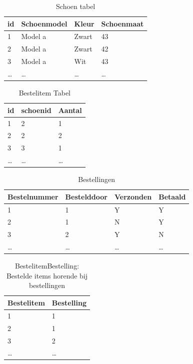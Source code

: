 \documentclass[11pt]{article}
\begin{document}
\begin{table}[hp]
  \centering
  \begin{tabular}{l|l|l|l}
    \textbf{id} & \textbf{Schoenmodel} & \textbf{Kleur} & \textbf{Schoenmaat} \\
    \hline
    1 & Model a              & Zwart          & 43 \\
    2 & Model a              & Zwart          & 42 \\
    3 & Model a              & Wit            & 43 \\
    \ldots & \ldots          & \ldots         & \ldots \\
  \end{tabular}
  \caption{Schoen tabel}
  \label{tab:schoen}
\end{table}

\begin{table}[hp]
  \centering
  \begin{tabular}{l|l|l}
    \textbf{id} & \textbf{schoenid} & \textbf{Aantal} \\\hline
    1           & 2                 & 1               \\
    2           & 2                 & 2               \\
    3           & 3                 & 1               \\
    \ldots      & \ldots            & \ldots          \\
  \end{tabular}
  \caption{Bestelitem Tabel}
  \label{tab:bestelitem}
\end{table}

\begin{table}[hp]
  \centering
  \begin{tabular}{l|l|l|l}
    \textbf{Bestelnummer} & \textbf{Bestelddoor} & \textbf{Verzonden} 
    & \textbf{Betaald} \\
    \hline
    1 & 1                &  Y & Y \\
    2 & 1                &  N & Y \\
    3 & 2                & Y  & N \\
    \ldots & \ldots & \ldots & \ldots \\
  \end{tabular}
  \caption{Bestellingen}
  \label{tab:bestellingen}
\end{table}

\begin{table}[hp]
  \centering
  \begin{tabular}{l|l}
    \textbf{Bestelitem} & \textbf{Bestelling}\\ 
    \hline
    1      & 1      \\
    2      & 1      \\
    3      & 2      \\
    \ldots & \ldots \\
  \end{tabular}
  \caption{BestelitemBestelling: Bestelde items horende bij bestellingen}
  \label{tab:bestelitembestelling}
\end{table}
\end{document}

